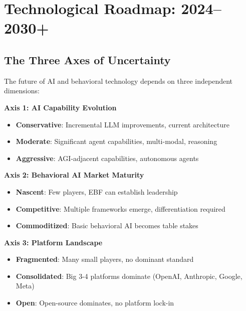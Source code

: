 \section{Technological Roadmap: 2024--2030+}
\label{sec:vvv1-roadmap-detail}

\subsection{The Three Axes of Uncertainty}

The future of AI and behavioral technology depends on three independent dimensions:

\begin{tcolorbox}[colback=blue!5!white, colframe=blue!75!black,
    title=Three Axes of Technological Uncertainty]

\textbf{Axis 1: AI Capability Evolution}
\begin{itemize}[nosep]
\item \textbf{Conservative}: Incremental LLM improvements, current architecture
\item \textbf{Moderate}: Significant agent capabilities, multi-modal, reasoning
\item \textbf{Aggressive}: AGI-adjacent capabilities, autonomous agents
\end{itemize}

\textbf{Axis 2: Behavioral AI Market Maturity}
\begin{itemize}[nosep]
\item \textbf{Nascent}: Few players, EBF can establish leadership
\item \textbf{Competitive}: Multiple frameworks emerge, differentiation required
\item \textbf{Commoditized}: Basic behavioral AI becomes table stakes
\end{itemize}

\textbf{Axis 3: Platform Landscape}
\begin{itemize}[nosep]
\item \textbf{Fragmented}: Many small players, no dominant standard
\item \textbf{Consolidated}: Big 3-4 platforms dominate (OpenAI, Anthropic, Google, Meta)
\item \textbf{Open}: Open-source dominates, no platform lock-in
\end{itemize}

\end{tcolorbox}


